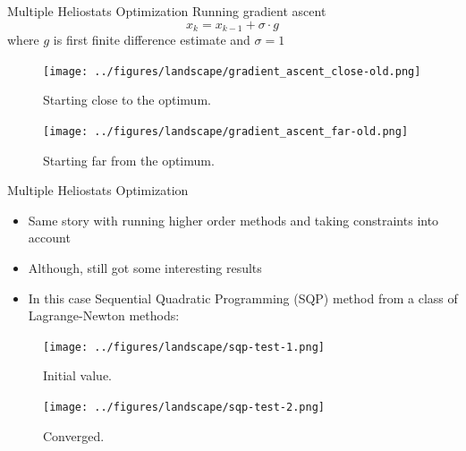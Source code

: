 \documentclass[10pt, xcolor={dvipsnames}]{beamer}
\begin{document}
\begin{frame}{Multiple Heliostats Optimization}
Running gradient ascent
\begin{equation}
x_{k} = x_{k - 1} + \sigma \cdot g
\end{equation}
where $g$ is first finite difference estimate and $\sigma = 1$
\begin{minipage}[t]{0.5\textwidth}
\begin{center}
\begin{figure}
\texttt{[image: ../figures/landscape/gradient\_ascent\_close-old.png]}
\caption{Starting close to the optimum.}
\end{figure}
\end{center}
\end{minipage}%
\begin{minipage}[t]{0.5\textwidth}
\vspace{0.1cm}
\begin{center}
\begin{figure}
\texttt{[image: ../figures/landscape/gradient\_ascent\_far-old.png]}
\caption{Starting far from the optimum.}
\end{figure}
\end{center}
\end{minipage}
\end{frame}

\begin{frame}{Multiple Heliostats Optimization}
\begin{itemize}
\item Same story with running higher order methods and taking constraints into account
\item Although, still got some interesting results
\item In this case Sequential Quadratic Programming (SQP) method from a class of Lagrange-Newton methods:
\end{itemize}
\begin{minipage}[t]{0.5\textwidth}
\begin{center}
\begin{figure}
\texttt{[image: ../figures/landscape/sqp-test-1.png]}
\caption{Initial value.}
\end{figure}
\end{center}
\end{minipage}%
\begin{minipage}[t]{0.5\textwidth}
\vspace{0.15cm}
\begin{center}
\begin{figure}
\texttt{[image: ../figures/landscape/sqp-test-2.png]}
\caption{Converged.}
\end{figure}
\end{center}
\end{minipage}
\end{frame}
\end{document}

